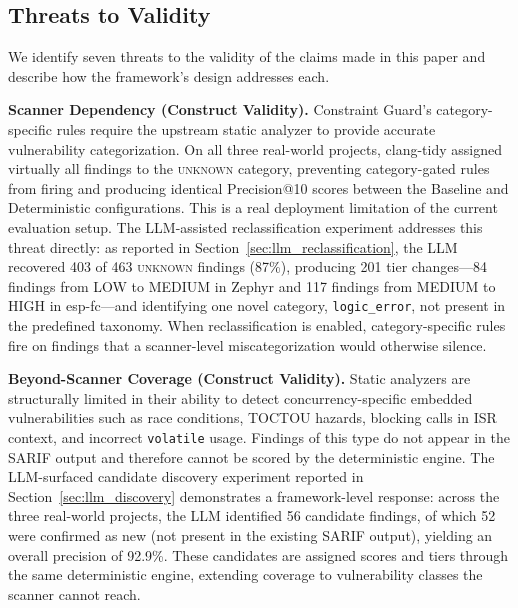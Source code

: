 
\subsection{Threats to Validity}

We identify seven threats to the validity of the claims made in this paper and describe how the framework's design addresses each.

\textbf{Scanner Dependency (Construct Validity).}
Constraint Guard's category-specific rules require the upstream static analyzer to provide accurate vulnerability categorization. On all three real-world projects, clang-tidy assigned virtually all findings to the \textsc{unknown} category, preventing category-gated rules from firing and producing identical Precision@10 scores between the Baseline and Deterministic configurations. This is a real deployment limitation of the current evaluation setup. The LLM-assisted reclassification experiment addresses this threat directly: as reported in Section~\ref{sec:llm_reclassification}, the LLM recovered 403 of 463 \textsc{unknown} findings (87\%), producing 201 tier changes---84 findings from LOW to MEDIUM in Zephyr and 117 findings from MEDIUM to HIGH in esp-fc---and identifying one novel category, \texttt{logic\_error}, not present in the predefined taxonomy. When reclassification is enabled, category-specific rules fire on findings that a scanner-level miscategorization would otherwise silence.

\textbf{Beyond-Scanner Coverage (Construct Validity).}
Static analyzers are structurally limited in their ability to detect concurrency-specific embedded vulnerabilities such as race conditions, TOCTOU hazards, blocking calls in ISR context, and incorrect \texttt{volatile} usage. Findings of this type do not appear in the SARIF output and therefore cannot be scored by the deterministic engine. The LLM-surfaced candidate discovery experiment reported in Section~\ref{sec:llm_discovery} demonstrates a framework-level response: across the three real-world projects, the LLM identified 56 candidate findings, of which 52 were confirmed as new (not present in the existing SARIF output), yielding an overall precision of 92.9\%. These candidates are assigned scores and tiers through the same deterministic engine, extending coverage to vulnerability classes the scanner cannot reach.

